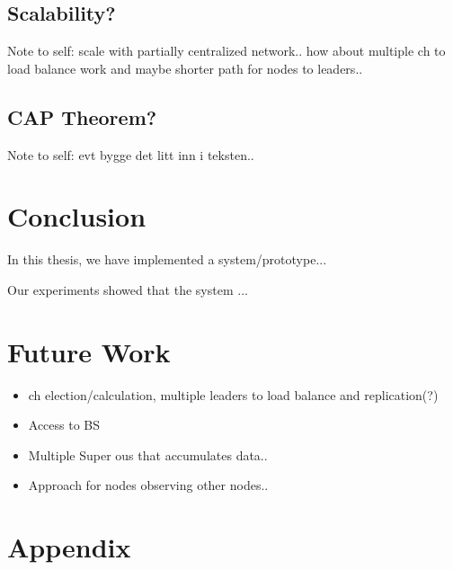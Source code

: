 \documentclass[USenglish]{uit-thesis}
\begin{document}
\section{Scalability?}
Note to self: scale with partially centralized network.. how about multiple \gls{ch} to load balance work and maybe shorter path for nodes to leaders..

\section{CAP Theorem?}
Note to self: evt bygge det litt inn i teksten..


\chapter{Conclusion}
In this thesis, we have implemented a system/prototype...

Our experiments showed that the system ...


\chapter{Future Work}

\begin{itemize}
\item \gls{ch} election/calculation, multiple leaders to load balance and replication(?)
\item Access to BS
\item Multiple Super \gls{ou}s that accumulates data..
\item Approach for nodes observing other nodes..
\end{itemize}

\chapter{Appendix}

\backmatter


\newpage{}
\end{document}

